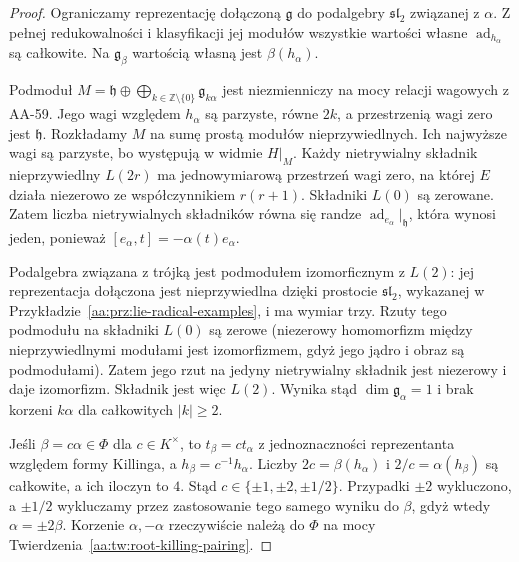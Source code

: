 \begin{proof}
Ograniczamy reprezentację dołączoną $\mathfrak g$ do podalgebry $\mathfrak{sl}_2$ związanej z $\alpha$. Z pełnej redukowalności i klasyfikacji jej modułów wszystkie wartości własne $\operatorname{ad}_{h_\alpha}$ są całkowite. Na $\mathfrak g_\beta$ wartością własną jest $\beta(h_\alpha)$.

Podmoduł $M=\mathfrak h\oplus\bigoplus_{k\in\mathbb Z\setminus\{0\}}\mathfrak g_{k\alpha}$ jest niezmienniczy na mocy relacji wagowych z AA-59. Jego wagi względem $h_\alpha$ są parzyste, równe $2k$, a przestrzenią wagi zero jest $\mathfrak h$. Rozkładamy $M$ na sumę prostą modułów nieprzywiedlnych. Ich najwyższe wagi są parzyste, bo występują w widmie $H|_M$. Każdy nietrywialny składnik nieprzywiedlny $L(2r)$ ma jednowymiarową przestrzeń wagi zero, na której $E$ działa niezerowo ze współczynnikiem $r(r+1)$. Składniki $L(0)$ są zerowane. Zatem liczba nietrywialnych składników równa się randze $\operatorname{ad}_{e_\alpha}|_{\mathfrak h}$, która wynosi jeden, ponieważ $[e_\alpha,t]=-\alpha(t)e_\alpha$.

Podalgebra związana z trójką jest podmodułem izomorficznym z $L(2)$: jej reprezentacja dołączona jest nieprzywiedlna dzięki prostocie $\mathfrak{sl}_2$, wykazanej w Przykładzie~\ref{aa:prz:lie-radical-examples}, i ma wymiar trzy. Rzuty tego podmodułu na składniki $L(0)$ są zerowe (niezerowy homomorfizm między nieprzywiedlnymi modułami jest izomorfizmem, gdyż jego jądro i obraz są podmodułami). Zatem jego rzut na jedyny nietrywialny składnik jest niezerowy i daje izomorfizm. Składnik jest więc $L(2)$. Wynika stąd $\dim\mathfrak g_\alpha=1$ i brak korzeni $k\alpha$ dla całkowitych $|k|\ge2$.

Jeśli $\beta=c\alpha\in\Phi$ dla $c\in K^\times$, to $t_\beta=ct_\alpha$ z jednoznaczności reprezentanta względem formy Killinga, a $h_\beta=c^{-1}h_\alpha$. Liczby $2c=\beta(h_\alpha)$ i $2/c=\alpha(h_\beta)$ są całkowite, a ich iloczyn to $4$. Stąd $c\in\{\pm1,\pm2,\pm1/2\}$. Przypadki $\pm2$ wykluczono, a $\pm1/2$ wykluczamy przez zastosowanie tego samego wyniku do $\beta$, gdyż wtedy $\alpha=\pm2\beta$. Korzenie $\alpha,-\alpha$ rzeczywiście należą do $\Phi$ na mocy Twierdzenia~\ref{aa:tw:root-killing-pairing}.
\end{proof}


